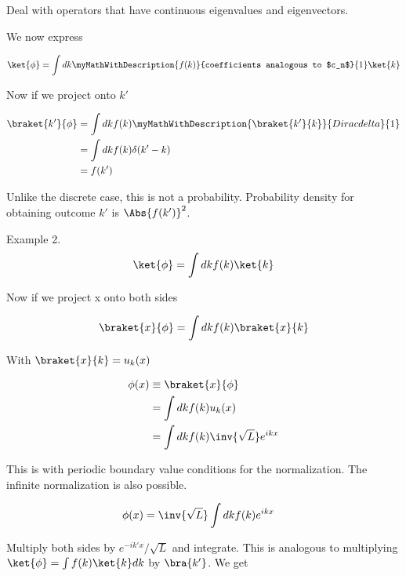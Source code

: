 %
%
Deal with operators that have continuous eigenvalues and eigenvectors.

We now express

\begin{align*}
\ket{\phi} = \int dk \myMathWithDescription{f(k)}{coefficients analogous to $c_n$}{1} \ket{k}
\end{align*}

Now if we project onto $k'$

\begin{align*}
\braket{k'}{\phi}
&= \int dk f(k) \myMathWithDescription{\braket{k'}{k}}{Dirac delta}{1} \\
&= \int dk f(k) \delta(k' -k) \\
&= f(k')
\end{align*}

Unlike the discrete case, this is not a probability.  Probability density for obtaining outcome $k'$ is $\Abs{f(k')}^2$.

Example 2.
\begin{align*}
\ket{\phi} = \int dk f(k) \ket{k}
\end{align*}

Now if we project x onto both sides

\begin{align*}
\braket{x}{\phi}
&= \int dk f(k) \braket{x}{k} \\
\end{align*}

With $\braket{x}{k} = u_k(x)$

\begin{align*}
\phi(x)
&\equiv \braket{x}{\phi} \\
&= \int dk f(k) u_k(x)  \\
&= \int dk f(k) \inv{\sqrt{L}} e^{ikx}
\end{align*}

This is with periodic boundary value conditions for the normalization.  The infinite normalization is also possible.

\begin{align*}
\phi(x)
&= \inv{\sqrt{L}} \int dk f(k) e^{ikx}
\end{align*}

Multiply both sides by $e^{-ik'x}/\sqrt{L}$ and integrate.  This is analogous to multiplying $\ket{\phi} = \int f(k) \ket{k} dk$ by $\bra{k'}$.  We get

